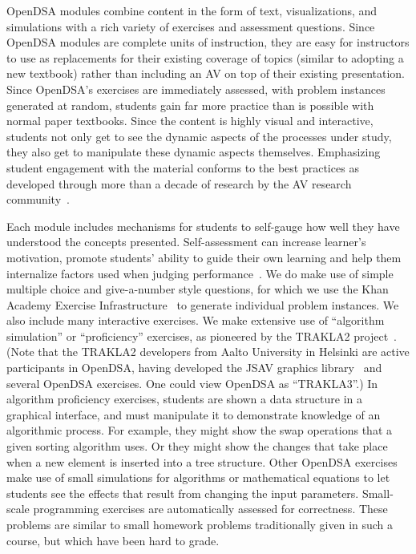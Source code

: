 \documentclass[11pt]{article}
\begin{document}
OpenDSA modules combine content in the form of text, visualizations,
and simulations with a rich variety of exercises and assessment
questions.
Since OpenDSA modules are complete units of instruction, they
are easy for instructors to use as replacements for their existing
coverage of topics (similar to adopting a new textbook) rather than
including an AV on top of their existing presentation.
Since OpenDSA's exercises are immediately assessed, with problem
instances generated at random, students gain far more practice than is
possible with normal paper textbooks.
Since the content is highly visual and interactive, students not only
get to see the dynamic aspects of the processes under study,
they also get to manipulate these dynamic aspects themselves.
Emphasizing student engagement with the material conforms to the best
practices as developed through more than a decade of research by the
AV research community~\cite{NapsPanelLong,NapsLongImpact,KorhonenWG13}.

Each module includes mechanisms for students to self-gauge how
well they have understood the concepts presented.
Self-assessment can increase learner's motivation, promote students'
ability to guide their own learning and help them internalize factors
used when judging performance~\cite{mcmillan2008,heidi09}.
We do make use of simple multiple choice and give-a-number
style questions, for which we use the Khan Academy Exercise
Infrastructure~\cite{KhanAcademyExercise} to generate individual
problem instances.
We also include many interactive exercises.
We make extensive use of ``algorithm simulation'' or ``proficiency''
exercises, as pioneered by the TRAKLA2 project~\cite{Malmi04}.
(Note that the TRAKLA2 developers from Aalto University in Helsinki are
active participants in OpenDSA, having developed the JSAV graphics
library~\cite{Karavirta:ITiCSE13,JSAVsite} and several OpenDSA exercises.
One could view OpenDSA as ``TRAKLA3''.)
In algorithm proficiency exercises, students are shown a data
structure in a graphical interface,
and must manipulate it to demonstrate knowledge of an algorithmic
process.
For example, they might show the swap operations that a given sorting
algorithm uses.
Or they might show the changes that take place when a new element is
inserted into a tree structure.
Other OpenDSA exercises make use of small simulations for algorithms
or mathematical equations to let students see the effects that result
from changing the input parameters.
Small-scale programming exercises are automatically assessed for
correctness.
These problems are similar to small homework problems traditionally
given in such a course, but which have been hard to grade.
\end{document}

